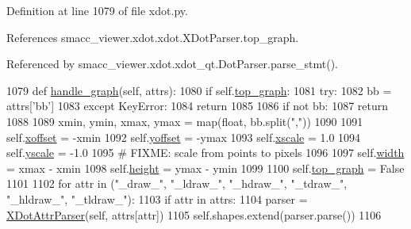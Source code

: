 Definition at line 1079 of file xdot.\+py.



References smacc\+\_\+viewer.\+xdot.\+xdot.\+X\+Dot\+Parser.\+top\+\_\+graph.



Referenced by smacc\+\_\+viewer.\+xdot.\+xdot\+\_\+qt.\+Dot\+Parser.\+parse\+\_\+stmt().


\begin{DoxyCode}
1079     \textcolor{keyword}{def }\hyperlink{classsmacc__viewer_1_1xdot_1_1xdot_1_1XDotParser_a733c3b35b32dca660005970397474a15}{handle\_graph}(self, attrs):
1080         \textcolor{keywordflow}{if} self.\hyperlink{classsmacc__viewer_1_1xdot_1_1xdot_1_1XDotParser_a5c873e467edfbfa937d8a59a8e1853c2}{top\_graph}:
1081             \textcolor{keywordflow}{try}:
1082                 bb = attrs[\textcolor{stringliteral}{'bb'}]
1083             \textcolor{keywordflow}{except} KeyError:
1084                 \textcolor{keywordflow}{return}
1085 
1086             \textcolor{keywordflow}{if} \textcolor{keywordflow}{not} bb:
1087                 \textcolor{keywordflow}{return}
1088 
1089             xmin, ymin, xmax, ymax = map(float, bb.split(\textcolor{stringliteral}{","}))
1090 
1091             self.\hyperlink{classsmacc__viewer_1_1xdot_1_1xdot_1_1XDotParser_a62eaf1edc60a3fc0fa9de0ea6e4e48ae}{xoffset} = -xmin
1092             self.\hyperlink{classsmacc__viewer_1_1xdot_1_1xdot_1_1XDotParser_ac9489fc14a7ba7229f965c327b479385}{yoffset} = -ymax
1093             self.\hyperlink{classsmacc__viewer_1_1xdot_1_1xdot_1_1XDotParser_a3c3b5417bb8d937745bc0160d568915f}{xscale} = 1.0
1094             self.\hyperlink{classsmacc__viewer_1_1xdot_1_1xdot_1_1XDotParser_a89fee1a8bb775af0509be2bce06b6e34}{yscale} = -1.0
1095             \textcolor{comment}{# FIXME: scale from points to pixels}
1096 
1097             self.\hyperlink{classsmacc__viewer_1_1xdot_1_1xdot_1_1XDotParser_a2fd09ff25776c1dcbb3b23fe1679a312}{width} = xmax - xmin
1098             self.\hyperlink{classsmacc__viewer_1_1xdot_1_1xdot_1_1XDotParser_adc64dc74de1a8ccd5e77455467999e90}{height} = ymax - ymin
1099 
1100             self.\hyperlink{classsmacc__viewer_1_1xdot_1_1xdot_1_1XDotParser_a5c873e467edfbfa937d8a59a8e1853c2}{top\_graph} = \textcolor{keyword}{False}
1101         
1102         \textcolor{keywordflow}{for} attr \textcolor{keywordflow}{in} (\textcolor{stringliteral}{"\_draw\_"}, \textcolor{stringliteral}{"\_ldraw\_"}, \textcolor{stringliteral}{"\_hdraw\_"}, \textcolor{stringliteral}{"\_tdraw\_"}, \textcolor{stringliteral}{"\_hldraw\_"}, \textcolor{stringliteral}{"\_tldraw\_"}):
1103             \textcolor{keywordflow}{if} attr \textcolor{keywordflow}{in} attrs:
1104                 parser = \hyperlink{classsmacc__viewer_1_1xdot_1_1xdot_1_1XDotAttrParser}{XDotAttrParser}(self, attrs[attr])
1105                 self.shapes.extend(parser.parse())
1106 
\end{DoxyCode}


